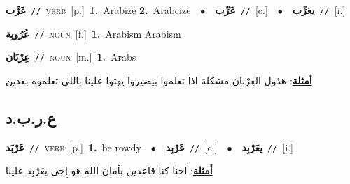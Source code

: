 \documentclass[10pt,a4paper,twoside]{article} %
\begin{document}
\begin{multicols}{2}
{\setlength\topsep{0pt}\textbf{\foreignlanguage{arabic}{عَرَّب}}\ {\color{gray}\texttt{//}\color{black}}\ \textsc{verb}\ [p.]\ \textbf{1.}~Arabize  \textbf{2.}~Arabcize\ \ $\bullet$\ \ \setlength\topsep{0pt}\textbf{\foreignlanguage{arabic}{عَرِّب}}\ {\color{gray}\texttt{//}\color{black}}\ [c.]\ \ $\bullet$\ \ \setlength\topsep{0pt}\textbf{\foreignlanguage{arabic}{يعَرِّب}}\ {\color{gray}\texttt{//}\color{black}}\ [i.]\ } \vspace{2mm}

{\setlength\topsep{0pt}\textbf{\foreignlanguage{arabic}{عُرُوبِة}}\ {\color{gray}\texttt{//}\color{black}}\ \textsc{noun}\ [f.]\ \textbf{1.}~Arabism Arabism\ } \vspace{2mm}

{\setlength\topsep{0pt}\textbf{\foreignlanguage{arabic}{عِرْبَان}}\ {\color{gray}\texttt{//}\color{black}}\ \textsc{noun}\ [m.]\ \textbf{1.}~Arabs\  \begin{flushright}\color{gray}\foreignlanguage{arabic}{\textbf{\underline{\foreignlanguage{arabic}{أمثلة}}}: هذول العِرْبان مشكلة اذا تعلموا بيصيروا يهتوا علينا باللي تعلموه بعدين}\end{flushright}\color{black}} \vspace{2mm}

\vspace{-3mm}
\subsection*{\color{blue}\foreignlanguage{arabic}{ع.ر.ب.د}\color{blue}{}} 

{\setlength\topsep{0pt}\textbf{\foreignlanguage{arabic}{عَرْبَد}}\ {\color{gray}\texttt{//}\color{black}}\ \textsc{verb}\ [p.]\ \textbf{1.}~be rowdy\ \ $\bullet$\ \ \setlength\topsep{0pt}\textbf{\foreignlanguage{arabic}{عَرْبِد}}\ {\color{gray}\texttt{//}\color{black}}\ [c.]\ \ $\bullet$\ \ \setlength\topsep{0pt}\textbf{\foreignlanguage{arabic}{يعَرْبِد}}\ {\color{gray}\texttt{//}\color{black}}\ [i.]\  \begin{flushright}\color{gray}\foreignlanguage{arabic}{\textbf{\underline{\foreignlanguage{arabic}{أمثلة}}}: احنا كنا قاعدين بأمان الله هو إِجى يعَرْبِد علينا}\end{flushright}\color{black}} \vspace{2mm}


\end{multicols}
\end{document}
